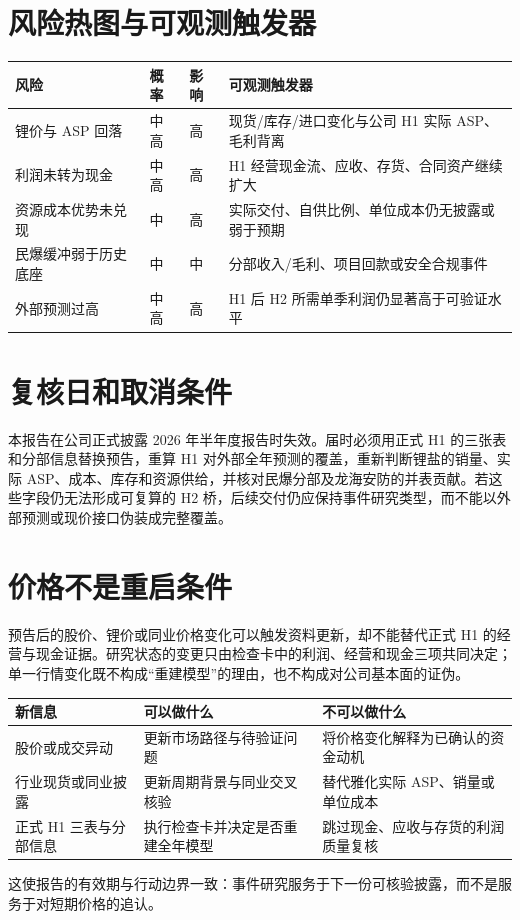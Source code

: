 \section{风险热图与可观测触发器}

\begin{tabularx}{\linewidth}{L{3.0cm}L{1.7cm}L{1.7cm}X}
\toprule
风险 & 概率 & 影响 & 可观测触发器 \\
\midrule
锂价与 ASP 回落 & 中高 & 高 & 现货/库存/进口变化与公司 H1 实际 ASP、毛利背离 \\
利润未转为现金 & 中高 & 高 & H1 经营现金流、应收、存货、合同资产继续扩大 \\
资源成本优势未兑现 & 中 & 高 & 实际交付、自供比例、单位成本仍无披露或弱于预期 \\
民爆缓冲弱于历史底座 & 中 & 中 & 分部收入/毛利、项目回款或安全合规事件 \\
外部预测过高 & 中高 & 高 & H1 后 H2 所需单季利润仍显著高于可验证水平 \\
\bottomrule
\end{tabularx}

\section{复核日和取消条件}

本报告在公司正式披露 2026 年半年度报告时失效。届时必须用正式 H1 的三张表和分部信息替换预告，重算 H1 对外部全年预测的覆盖，重新判断锂盐的销量、实际 ASP、成本、库存和资源供给，并核对民爆分部及龙海安防的并表贡献。若这些字段仍无法形成可复算的 H2 桥，后续交付仍应保持事件研究类型，而不能以外部预测或现价接口伪装成完整覆盖。

\section{价格不是重启条件}

预告后的股价、锂价或同业价格变化可以触发资料更新，却不能替代正式 H1 的经营与现金证据。研究状态的变更只由检查卡中的利润、经营和现金三项共同决定；单一行情变化既不构成“重建模型”的理由，也不构成对公司基本面的证伪。

\begin{exhibitbox}[事件期间的信息处理纪律]
\begin{tabularx}{\exhibitboxwidth}{L{3.0cm}X X}
\toprule
新信息 & 可以做什么 & 不可以做什么 \\
\midrule
股价或成交异动 & 更新市场路径与待验证问题 & 将价格变化解释为已确认的资金动机 \\
行业现货或同业披露 & 更新周期背景与同业交叉核验 & 替代雅化实际 ASP、销量或单位成本 \\
正式 H1 三表与分部信息 & 执行检查卡并决定是否重建全年模型 & 跳过现金、应收与存货的利润质量复核 \\
\bottomrule
\end{tabularx}
\end{exhibitbox}

这使报告的有效期与行动边界一致：事件研究服务于下一份可核验披露，而不是服务于对短期价格的追认。
